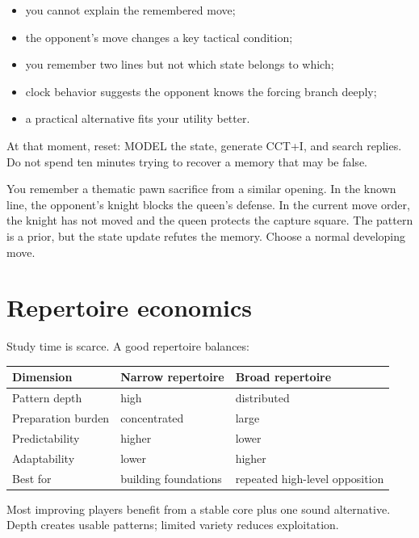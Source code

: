 \begin{itemize}[leftmargin=1.4em]
\item you cannot explain the remembered move;
\item the opponent's move changes a key tactical condition;
\item you remember two lines but not which state belongs to which;
\item clock behavior suggests the opponent knows the forcing branch deeply;
\item a practical alternative fits your utility better.
\end{itemize}

At that moment, reset: MODEL the state, generate CCT+I, and search replies. Do not spend ten minutes trying to recover a memory that may be false.

\begin{workedbox}[title={Worked example: the poisoned memory}]
You remember a thematic pawn sacrifice from a similar opening. In the known line, the opponent's knight blocks the queen's defense. In the current move order, the knight has not moved and the queen protects the capture square. The pattern is a prior, but the state update refutes the memory. Choose a normal developing move.
\end{workedbox}

\section{Repertoire economics}
Study time is scarce. A good repertoire balances:

\begin{center}
\begin{tabularx}{.92\textwidth}{p{}YY}
\toprule
\textbf{Dimension} & \textbf{Narrow repertoire} & \textbf{Broad repertoire}\\
\midrule
Pattern depth & high & distributed\\
Preparation burden & concentrated & large\\
Predictability & higher & lower\\
Adaptability & lower & higher\\
Best for & building foundations & repeated high-level opposition\\
\bottomrule
\end{tabularx}
\end{center}

Most improving players benefit from a stable core plus one sound alternative. Depth creates usable patterns; limited variety reduces exploitation.

